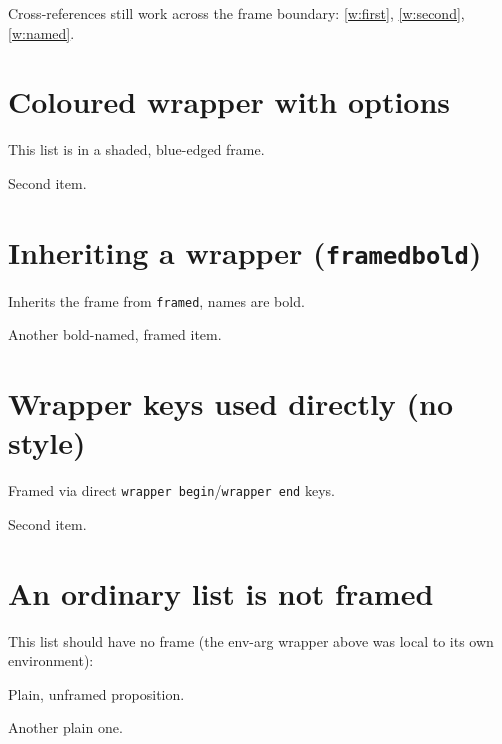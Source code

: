 \documentclass{article}
\begin{document}
Cross-references still work across the frame boundary:
\ref{w:first}, \ref{w:second}, \ref{w:named}.

\section{Coloured wrapper with options}

\begin{prop}[style=shaded]
  \item This list is in a shaded, blue-edged frame.
  \item Second item.
\end{prop}

\section{Inheriting a wrapper (\texttt{framedbold})}

\begin{prop}[style=framedbold]
  \item[Lemma] Inherits the frame from \texttt{framed}, names are bold.
  \item[Corollary] Another bold-named, framed item.
\end{prop}

\section{Wrapper keys used directly (no style)}

\begin{prop}[wrapper begin = {\begin{mdframed}}, wrapper end = {\end{mdframed}}]
  \item Framed via direct \texttt{wrapper begin}/\texttt{wrapper end} keys.
  \item Second item.
\end{prop}

\section{An ordinary list is not framed}

This list should have no frame (the env-arg wrapper above was local to its
own environment):

\begin{prop}
  \item Plain, unframed proposition.
  \item Another plain one.
\end{prop}
\end{document}
